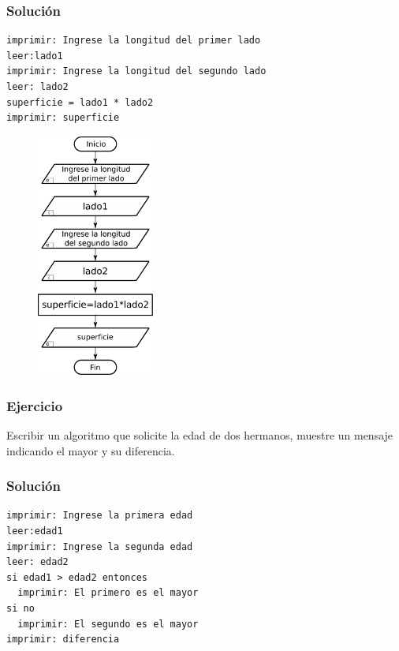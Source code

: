 \subsubsection*{Solución}
\begin{lstlisting}[style=pseudocodigo]
imprimir: Ingrese la longitud del primer lado
leer:lado1
imprimir: Ingrese la longitud del segundo lado
leer: lado2
superficie = lado1 * lado2
imprimir: superficie
\end{lstlisting}

\begin{figure}[h!]
  \centering
  \includegraphics[height=80mm]{./img/ejercicio_1.pdf} 
\end{figure}

\pagebreak

\subsubsection{Ejercicio}
Escribir un algoritmo que solicite la edad de dos hermanos, muestre un mensaje indicando el mayor y su diferencia.

\subsubsection*{Solución}
\begin{lstlisting}[style=pseudocodigo]
imprimir: Ingrese la primera edad
leer:edad1
imprimir: Ingrese la segunda edad
leer: edad2
si edad1 > edad2 entonces
  imprimir: El primero es el mayor
si no
  imprimir: El segundo es el mayor
imprimir: diferencia
\end{lstlisting}

